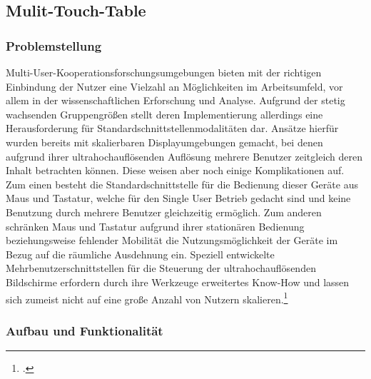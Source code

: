 \subsection{Mulit-Touch-Table}
\subsubsection{Problemstellung}
Multi-User-Kooperationsforschungsumgebungen bieten mit der richtigen Einbindung der Nutzer eine Vielzahl an Möglichkeiten im Arbeitsumfeld, vor allem in der wissenschaftlichen Erforschung und Analyse. Aufgrund der stetig wachsenden Gruppengrößen stellt deren Implementierung allerdings eine Herausforderung für Standardschnittstellenmodalitäten dar. Ansätze hierfür wurden bereits mit skalierbaren Displayumgebungen gemacht, bei denen aufgrund ihrer ultrahochauflösenden Auflösung mehrere Benutzer zeitgleich deren Inhalt betrachten können. Diese weisen aber noch einige Komplikationen auf. Zum einen besteht die Standardschnittstelle für die Bedienung dieser Geräte aus Maus und Tastatur, welche für den Single User Betrieb gedacht sind und keine Benutzung durch mehrere Benutzer gleichzeitig ermöglich. Zum anderen schränken Maus und Tastatur aufgrund ihrer stationären Bedienung beziehungsweise fehlender Mobilität die Nutzungsmöglichkeit der Geräte im Bezug auf die räumliche Ausdehnung ein. Speziell entwickelte Mehrbenutzerschnittstellen für die Steuerung der ultrahochauflösenden Bildschirme erfordern durch ihre Werkzeuge erweitertes Know-How und lassen sich zumeist nicht auf eine große Anzahl von Nutzern skalieren.\footcite[Vgl.][Seite 649]{Table}

\newpage
\subsubsection{Aufbau und Funktionalität}